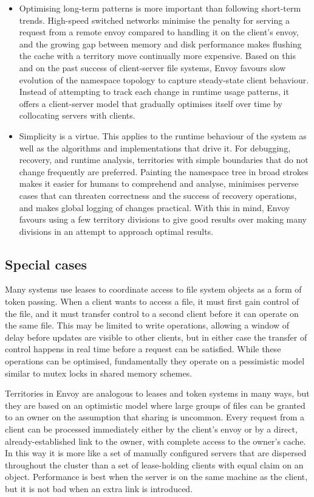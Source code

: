 \begin{itemize}
\item Optimising long-term patterns is more important than following short-term trends. High-speed switched networks minimise the penalty for serving a request from a remote envoy compared to handling it on the client's envoy, and the growing gap between memory and disk performance makes flushing the cache with a territory move continually more expensive. Based on this and on the past success of client-server file systems, Envoy favours slow evolution of the namespace topology to capture steady-state client behaviour. Instead of attempting to track each change in runtime usage patterns, it offers a client-server model that gradually optimises itself over time by collocating servers with clients.

\item Simplicity is a virtue. This applies to the runtime behaviour of the system as well as the algorithms and implementations that drive it. For debugging, recovery, and runtime analysis, territories with simple boundaries that do not change frequently are preferred. Painting the namespace tree in broad strokes makes it easier for humans to comprehend and analyse, minimises perverse cases that can threaten correctness and the success of recovery operations, and makes global logging of changes practical. With this in mind, Envoy favours using a few territory divisions to give good results over making many divisions in an attempt to approach optimal results.
\end{itemize}

\subsection{Special cases}

Many systems use leases to coordinate access to file system objects as a form of token passing. When a client wants to access a file, it must first gain control of the file, and it must transfer control to a second client before it can operate on the same file. This may be limited to write operations, allowing a window of delay before updates are visible to other clients, but in either case the transfer of control happens in real time before a request can be satisfied. While these operations can be optimised, fundamentally they operate on a pessimistic model similar to mutex locks in shared memory schemes.

Territories in Envoy are analogous to leases and token systems in many ways, but they are based on an optimistic model where large groups of files can be granted to an owner on the assumption that sharing is uncommon. Every request from a client can be processed immediately either by the client's envoy or by a direct, already-established link to the owner, with complete access to the owner's cache. In this way it is more like a set of manually configured servers that are dispersed throughout the cluster than a set of lease-holding clients with equal claim on an object. Performance is best when the server is on the same machine as the client, but it is not bad when an extra link is introduced.

